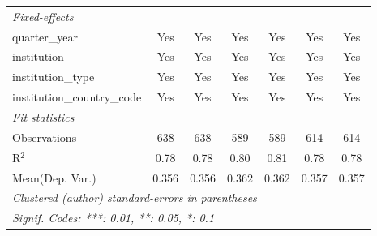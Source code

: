 \begin{tabular}{lcccccc}
   \midrule
   \emph{Fixed-effects}\\
   quarter\_year                      & Yes     & Yes        & Yes     & Yes          & Yes        & Yes\\  
   institution                        & Yes     & Yes        & Yes     & Yes          & Yes        & Yes\\  
   institution\_type                  & Yes     & Yes        & Yes     & Yes          & Yes        & Yes\\  
   institution\_country\_code         & Yes     & Yes        & Yes     & Yes          & Yes        & Yes\\  
   \midrule
   \emph{Fit statistics}\\
   Observations                       & 638     & 638        & 589     & 589          & 614        & 614\\  
   R$^2$                              & 0.78    & 0.78       & 0.80    & 0.81         & 0.78       & 0.78\\  
Mean(Dep. Var.) & 0.356 & 0.356 & 0.362 & 0.362 & 0.357 & 0.357 \\
   \midrule \midrule
   \multicolumn{7}{l}{\emph{Clustered (author) standard-errors in parentheses}}\\
   \multicolumn{7}{l}{\emph{Signif. Codes: ***: 0.01, **: 0.05, *: 0.1}}\\
\end{tabular}
\par\endgroup
